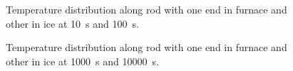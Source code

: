 \begin{figure}
    \centering
    \caption{Temperature distribution along rod with one end in furnace and other in ice at \SI{10}{\second} and \SI{100}{\second}.}
\end{figure}

\begin{figure}
    \ContinuedFloat
    \centering
    \caption{Temperature distribution along rod with one end in furnace and other in ice at \SI{1000}{\second} and \SI{10000}{\second}.}
    \label{fig:cold_diffusion_normal}
\end{figure}
